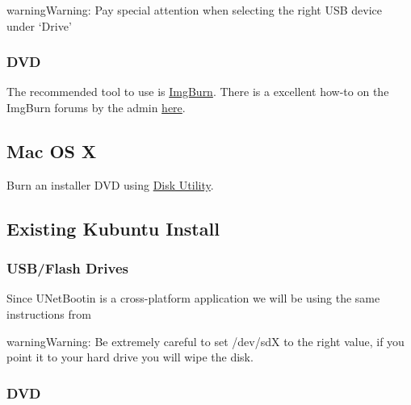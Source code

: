 \documentclass[letterpaper,10pt,english]{sphinxmanual}
\begin{document}
\begin{sphinxadmonition}{warning}{Warning:}
Pay special attention when selecting the right USB device under `Drive'
\end{sphinxadmonition}


\subsubsection{DVD}
\label{\detokenize{docs/installation:dvd}}
The recommended tool to use is \href{http://www.imgburn.com/}{ImgBurn}. There is a excellent how-to on the ImgBurn forums by the admin \href{http://forum.imgburn.com/index.php?/topic/61-how-to-write-an-image-file-to-a-disc-using-imgburn/}{here}.


\subsection{Mac OS X}
\label{\detokenize{docs/installation:kubuntu-install-link}}\label{\detokenize{docs/installation:mac-os-x}}
Burn an installer DVD using \href{https://help.ubuntu.com/community/BurningIsoHowto\#Burning\_from\_Mac\_OS\_X}{Disk Utility}.


\subsection{Existing Kubuntu Install}
\label{\detokenize{docs/installation:existing-kubuntu-install}}

\subsubsection{USB/Flash Drives}
\label{\detokenize{docs/installation:id1}}
Since UNetBootin is a cross-platform application we will be using the same instructions from {\hyperref[\detokenize{docs/installation:usb-drives-link}]{}}

\begin{sphinxadmonition}{warning}{Warning:}
Be extremely careful to set /dev/sdX to the right value, if you point it to your hard drive you will wipe the disk.
\end{sphinxadmonition}


\subsubsection{DVD}
\label{\detokenize{docs/installation:id2}}
\end{document}

